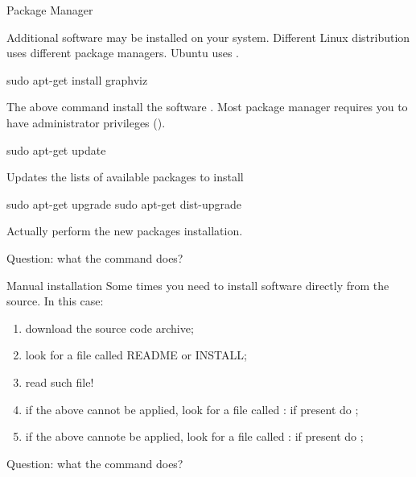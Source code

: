 \begin{frame}[fragile]{Package Manager}

Additional software may be installed on your system. Different Linux distribution uses different package managers.
Ubuntu uses .

\begin{verbbox}
sudo apt-get install graphviz
\end{verbbox}
\fbox{\theverbbox[t]}

The above command install the software . Most package manager requires you to have administrator privileges ().

\begin{verbbox}
sudo apt-get update
\end{verbbox}
\fbox{\theverbbox[t]}

Updates the lists of available packages to install\cite{linux:update:upgrade}

\begin{verbbox}
sudo apt-get upgrade
sudo apt-get dist-upgrade
\end{verbbox}
\fbox{\theverbbox[t]}

Actually perform the new packages installation.

Question: what the command  does?

\end{frame}

\begin{frame}{Manual installation}
Some times you need to install software directly from the source. In this case:
\begin{enumerate}
	\item download the source code archive;
	\item look for a file called README or INSTALL;
	\item read such file!
	\item if the above cannot be applied, look for a file called : if present do ;
	\item if the above cannote be applied, look for a file called : if present do ;
\end{enumerate}

Question: what the command \code{\&\&} does?
\end{frame}

